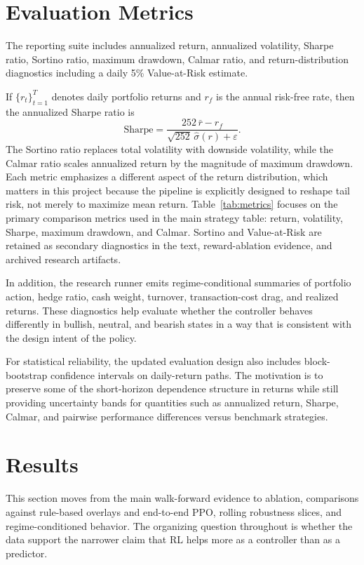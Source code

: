 \documentclass[11pt]{article}
\begin{document}
\section{Evaluation Metrics}

The reporting suite includes annualized return, annualized volatility, Sharpe
ratio, Sortino ratio, maximum drawdown, Calmar ratio, and return-distribution
diagnostics including a daily 5\% Value-at-Risk estimate.

If $\{r_t\}_{t=1}^T$ denotes daily portfolio returns and $r_f$ is the annual
risk-free rate, then the annualized Sharpe ratio is
\[
\text{Sharpe} = \frac{252 \, \bar{r} - r_f}{\sqrt{252}\,\hat{\sigma}(r) + \varepsilon}.
\]
The Sortino ratio replaces total volatility with downside volatility, while the
Calmar ratio scales annualized return by the magnitude of maximum drawdown. Each
metric emphasizes a different aspect of the return distribution, which matters in
this project because the pipeline is explicitly designed to reshape tail risk,
not merely to maximize mean return.
Table~\ref{tab:metrics} focuses on the primary comparison metrics used in the
main strategy table: return, volatility, Sharpe, maximum drawdown, and Calmar.
Sortino and Value-at-Risk are retained as secondary diagnostics in the text,
reward-ablation evidence, and archived research artifacts.

In addition, the research runner emits regime-conditional summaries of
portfolio action, hedge ratio, cash weight, turnover, transaction-cost drag, and
realized returns. These diagnostics help evaluate whether the controller
behaves differently in bullish, neutral, and bearish states in a way that is
consistent with the design intent of the policy.

For statistical reliability, the updated evaluation design also includes
block-bootstrap confidence intervals on daily-return paths. The motivation is to
preserve some of the short-horizon dependence structure in returns while still
providing uncertainty bands for quantities such as annualized return, Sharpe,
Calmar, and pairwise performance differences versus benchmark strategies.

\section{Results}

This section moves from the main walk-forward evidence to ablation, comparisons
against rule-based overlays and end-to-end PPO, rolling robustness slices, and
regime-conditioned behavior. The organizing question throughout is whether the
data support the narrower claim that RL helps more as a controller than as a
predictor.
\end{document}
